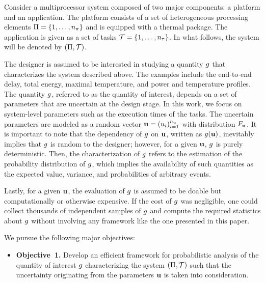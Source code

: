 Consider a multiprocessor system composed of two major components: a platform
and an application. The platform consists of a set of heterogeneous processing
elements $\Pi = \{ 1, \dots, {n_\pi} \}$ and is equipped with a thermal package.
The application is given as a set of tasks $\mathcal{T} = \{ 1, \dots, {n_\tau} \}$. In
what follows, the system will be denoted by $(\Pi, \mathcal{T})$.

The designer is assumed to be interested in studying a quantity $g$ that
characterizes the system described above. The examples include the end-to-end
delay, total energy, maximal temperature, and power and temperature profiles.
The quantity $g$, referred to as the quantity of interest, depends on a set of
parameters that are uncertain at the design stage. In this work, we focus on
system-level parameters such as the execution times of the tasks. The uncertain
parameters are modeled as a random vector $\mathbf{u} = (u_i)_{i = 1}^{n_u}$ with
distribution $F_{\mathbf{u}}$. It is important to note that the dependency of
$g$ on $\mathbf{u}$, written as $g(\mathbf{u})$, inevitably implies that $g$ is random to
the designer; however, for a given $\mathbf{u}$, $g$ is purely deterministic. Then,
the characterization of $g$ refers to the estimation of the probability
distribution of $g$, which implies the availability of such quantities as the
expected value, variance, and probabilities of arbitrary events.

Lastly, for a given $\mathbf{u}$, the evaluation of $g$ is assumed to be doable but
computationally or otherwise expensive. If the cost of $g$ was negligible, one
could collect thousands of independent samples of $g$ and compute the required
statistics about $g$ without involving any framework like the one presented in
this paper.

We pursue the following major objectives:
\begin{itemize}

\item \textbf{Objective~1.} Develop an efficient framework for probabilistic
  analysis of the quantity of interest $g$ characterizing the system $(\Pi,
  \mathcal{T})$ such that the uncertainty originating from the parameters $\mathbf{u}$ is
  taken into consideration.

\end{itemize}
